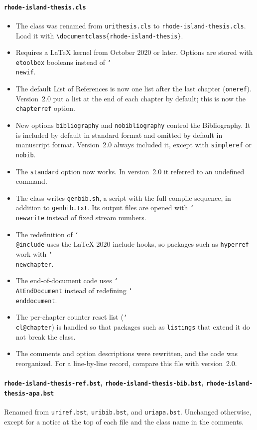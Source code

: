 \documentclass[11pt]{article}
\newcommand\cs[1]{\texttt{\char`\\#1}}
\newcommand\opt[1]{\texttt{#1}}
\newcommand\file[1]{\texttt{#1}}
\begin{document}
\paragraph{\file{rhode-island-thesis.cls}}
\begin{itemize}
\item The class was renamed from \file{urithesis.cls} to
  \file{rhode-island-thesis.cls}. Load it with
  \verb|\documentclass{rhode-island-thesis}|.
\item Requires a \LaTeX{} kernel from October 2020 or later.
  Options are stored with \texttt{etoolbox} booleans instead of \cs{newif}.
\item The default List of References is now one list after the last chapter
  (\opt{oneref}). Version~2.0 put a list at the end of each chapter by
  default; this is now the \opt{chapterref} option.
\item New options \opt{bibliography} and \opt{nobibliography} control the
  Bibliography. It is included by default in standard format and omitted by
  default in manuscript format. Version~2.0 always included it, except with
  \opt{simpleref} or \opt{nobib}.
\item The \opt{standard} option now works. In version~2.0 it referred to an
  undefined command.
\item The class writes \file{genbib.sh}, a script with the full compile
  sequence, in addition to \file{genbib.txt}. Its output files are opened with
  \cs{newwrite} instead of fixed stream numbers.
\item The redefinition of \cs{@include} uses the \LaTeX{} 2020 include hooks,
  so packages such as \texttt{hyperref} work with \cs{newchapter}.
\item The end-of-document code uses \cs{AtEndDocument} instead of redefining
  \cs{enddocument}.
\item The per-chapter counter reset list (\cs{cl@chapter}) is handled so that
  packages such as \texttt{listings} that extend it do not break the class.
\item The comments and option descriptions were rewritten, and the code was
  reorganized. For a line-by-line record, compare this file with version~2.0.
\end{itemize}

\paragraph{\file{rhode-island-thesis-ref.bst}, \file{rhode-island-thesis-bib.bst}, \file{rhode-island-thesis-apa.bst}}
Renamed from \file{uriref.bst}, \file{uribib.bst}, and \file{uriapa.bst}.
Unchanged otherwise, except for a notice at the top of each file and the class
name in the comments.
\end{document}
